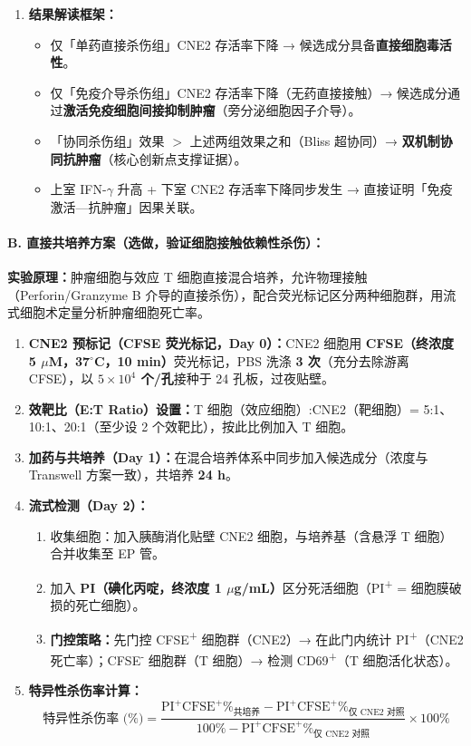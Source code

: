\documentclass[12pt,a4paper,twoside]{article}
\begin{document}
\begin{enumerate}
  \item \textbf{结果解读框架：}
  \begin{itemize}
    \item 仅「单药直接杀伤组」CNE2 存活率下降 → 候选成分具备\textbf{直接细胞毒活性}。
    \item 仅「免疫介导杀伤组」CNE2 存活率下降（无药直接接触）→ 候选成分通过\textbf{激活免疫细胞间接抑制肿瘤}（旁分泌细胞因子介导）。
    \item 「协同杀伤组」效果 $>$ 上述两组效果之和（Bliss 超协同）→ \textbf{双机制协同抗肿瘤}（核心创新点支撑证据）。
    \item 上室 IFN-$\gamma$ 升高 + 下室 CNE2 存活率下降同步发生 → 直接证明「免疫激活—抗肿瘤」因果关联。
  \end{itemize}
\end{enumerate}

\paragraph{B. 直接共培养方案（选做，验证细胞接触依赖性杀伤）：}

\textbf{实验原理：}肿瘤细胞与效应 T 细胞直接混合培养，允许物理接触（Perforin/Granzyme B 介导的直接杀伤），配合荧光标记区分两种细胞群，用流式细胞术定量分析肿瘤细胞死亡率。

\begin{enumerate}
  \item \textbf{CNE2 预标记（CFSE 荧光标记，Day 0）：}CNE2 细胞用 \textbf{CFSE（终浓度 5 $\mu$M，37$^{\circ}$C，10 min）}荧光标记，PBS 洗涤 \textbf{3 次}（充分去除游离 CFSE），以 \textbf{$5 \times 10^4$ 个/孔}接种于 24 孔板，过夜贴壁。
  \item \textbf{效靶比（E:T Ratio）设置：}T 细胞（效应细胞）:CNE2（靶细胞）= 5:1、10:1、20:1（至少设 2 个效靶比），按此比例加入 T 细胞。
  \item \textbf{加药与共培养（Day 1）：}在混合培养体系中同步加入候选成分（浓度与 Transwell 方案一致），共培养 \textbf{24 h}。
  \item \textbf{流式检测（Day 2）：}
  \begin{enumerate}
    \item 收集细胞：加入胰酶消化贴壁 CNE2 细胞，与培养基（含悬浮 T 细胞）合并收集至 EP 管。
    \item 加入 \textbf{PI（碘化丙啶，终浓度 1 $\mu$g/mL）}区分死活细胞（PI\textsuperscript{+} = 细胞膜破损的死亡细胞）。
    \item \textbf{门控策略：}先门控 CFSE\textsuperscript{+} 细胞群（CNE2）→ 在此门内统计 PI\textsuperscript{+}（CNE2 死亡率）；CFSE\textsuperscript{-} 细胞群（T 细胞）→ 检测 CD69\textsuperscript{+}（T 细胞活化状态）。
  \end{enumerate}
  \item \textbf{特异性杀伤率计算：}
  \[
  \text{特异性杀伤率 (\%)} = \frac{\text{PI}^{+}\text{CFSE}^{+}\%_{\text{共培养}} - \text{PI}^{+}\text{CFSE}^{+}\%_{\text{仅 CNE2 对照}}}{100\% - \text{PI}^{+}\text{CFSE}^{+}\%_{\text{仅 CNE2 对照}}} \times 100\%
  \]
\end{enumerate}
\end{document}
